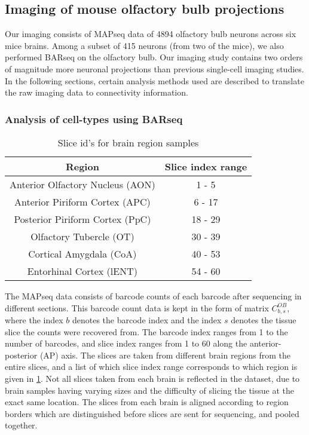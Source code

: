 \documentclass[../dissertation.tex]{subfiles}
\begin{document}
\subsection{Imaging of mouse olfactory bulb projections}

Our imaging consists of MAPseq data of 4894 olfactory bulb neurons across six mice brains.
Among a subset of 415 neurons (from two of the mice), we also performed BARseq on the olfactory bulb.
Our imaging study contains two orders of magnitude more neuronal projections than previous single-cell imaging studies.
In the following sections, certain analysis methods used are described to translate the raw imaging data to connectivity information.

\subsubsection{Analysis of cell-types using BARseq}

\begin{table}
    \centering
    \begin{tabular}{cc}
        \toprule
        \textbf{Region} & \textbf{Slice index range}    \\ \midrule
        Anterior Olfactory Nucleus (AON)    &  1 - 5    \\
        Anterior Piriform Cortex (APC)      &  6 - 17   \\
        Posterior Piriform Cortex (PpC)     & 18 - 29   \\
        Olfactory Tubercle (OT)             & 30 - 39   \\
        Cortical Amygdala (CoA)             & 40 - 53   \\
        Entorhinal Cortex (lENT)            & 54 - 60   \\ \bottomrule
    \end{tabular}
    \caption{Slice id's for brain region samples}
    \label{tab:mapseq-slice}
\end{table}

The MAPseq data consists of barcode counts of each barcode after sequencing in different sections.
This barcode count data is kept in the form of matrix $C^{OB}_{b,s}$, where the index $b$ denotes the barcode index and the index $s$ denotes the tissue slice the counts were recovered from.
The barcode index ranges from 1 to the number of barcodes, and slice index ranges from 1 to 60 along the anterior-posterior (AP) axis. 
The slices are taken from different brain regions from the entire slices, and a list of which slice index range corresponds to which region is given in \cref{tab:mapseq-slice}.
Not all slices taken from each brain is reflected in the dataset, due to brain samples having varying sizes and the difficulty of slicing the tissue at the exact same location.
The slices from each brain is aligned according to region borders which are distinguished before slices are sent for sequencing, and pooled together.
\end{document}

